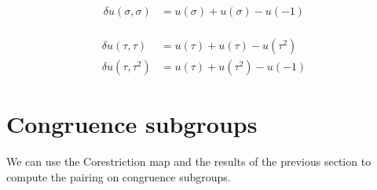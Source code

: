\documentclass[12pt]{article}
\theoremstyle{definition}
\def\Z{{\Bbb Z}}
\def\Q{{\Bbb Q}}
\def\Hom{\text{Hom}}
\def\CoInd{\operatorname{CoInd}}
\begin{document}
\begin{align*}
\delta u(\sigma,\sigma) &=u(\sigma)+ u(\sigma)-u(-1)\\
\end{align*}

\begin{align*}
\delta u (\tau,\tau) & = u(\tau) + u(\tau) - u(\tau^2)\\
\delta u(\tau,\tau^2) & = u(\tau)+u(\tau^2)- u(-1)
\end{align*}


\section{Congruence subgroups}
We can use the Corestriction map and the results of the previous section to compute the pairing on congruence subgroups.
%
%
%
%
%
%
\end{document}
